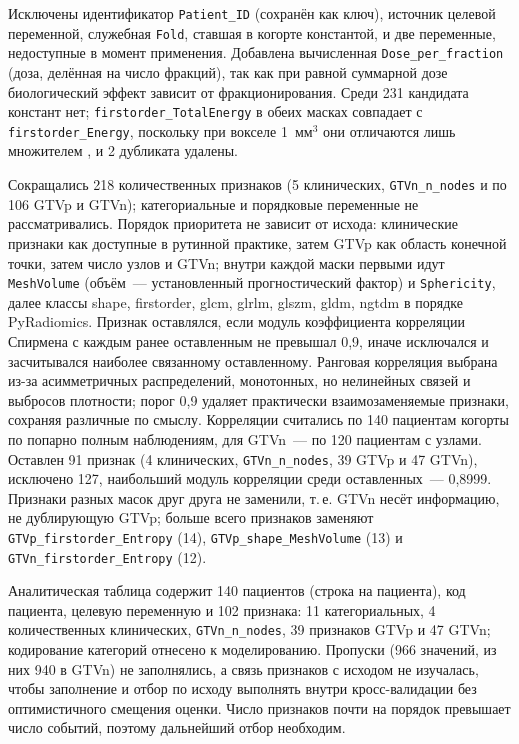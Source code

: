 \documentclass[11pt,a4paper,twocolumn]{article}
\newcommand{\var}[1]{\texttt{#1}}
\begin{document}
Исключены идентификатор \var{Patient\_ID} (сохранён как ключ), источник целевой переменной, служебная \var{Fold}, ставшая в когорте константой, и две переменные, недоступные в момент применения. Добавлена вычисленная \var{Dose\_per\_fraction} (доза, делённая на число фракций), так как при равной суммарной дозе биологический эффект зависит от фракционирования. Среди 231 кандидата констант нет; \var{firstorder\_TotalEnergy} в обеих масках совпадает с \var{firstorder\_Energy}, поскольку при вокселе 1~мм$^3$ они отличаются лишь множителем \parencite{pyradiomicsdocs}, и 2 дубликата удалены.

Сокращались 218 количественных признаков (5 клинических, \var{GTVn\_n\_nodes} и по 106 GTVp и GTVn); категориальные и порядковые переменные не рассматривались. Порядок приоритета не зависит от исхода: клинические признаки как доступные в рутинной практике, затем GTVp как область конечной точки, затем число узлов и GTVn; внутри каждой маски первыми идут \var{MeshVolume} (объём~--- установленный прогностический фактор) и \var{Sphericity}, далее классы shape, firstorder, glcm, glrlm, glszm, gldm, ngtdm в порядке PyRadiomics. Признак оставлялся, если модуль коэффициента корреляции Спирмена с каждым ранее оставленным не превышал 0,9, иначе исключался и засчитывался наиболее связанному оставленному. Ранговая корреляция выбрана из-за асимметричных распределений, монотонных, но нелинейных связей и выбросов плотности; порог 0,9 удаляет практически взаимозаменяемые признаки, сохраняя различные по смыслу. Корреляции считались по 140 пациентам когорты по попарно полным наблюдениям, для GTVn~--- по 120 пациентам с узлами. Оставлен 91 признак (4 клинических, \var{GTVn\_n\_nodes}, 39 GTVp и 47 GTVn), исключено 127, наибольший модуль корреляции среди оставленных~--- 0,8999. Признаки разных масок друг друга не заменили, т.\,е. GTVn несёт информацию, не дублирующую GTVp; больше всего признаков заменяют \var{GTVp\_firstorder\_Entropy} (14), \var{GTVp\_shape\_MeshVolume} (13) и \var{GTVn\_firstorder\_Entropy} (12).

Аналитическая таблица содержит 140 пациентов (строка на пациента), код пациента, целевую переменную и 102 признака: 11 категориальных, 4 количественных клинических, \var{GTVn\_n\_nodes}, 39 признаков GTVp и 47 GTVn; кодирование категорий отнесено к моделированию. Пропуски (966 значений, из них 940 в GTVn) не заполнялись, а связь признаков с исходом не изучалась, чтобы заполнение и отбор по исходу выполнять внутри кросс-валидации без оптимистичного смещения оценки. Число признаков почти на порядок превышает число событий, поэтому дальнейший отбор необходим.
\end{document}

